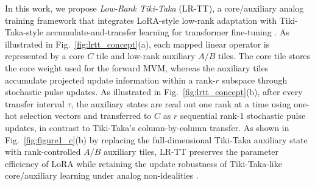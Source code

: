 \documentclass[AMA,LATO2COL]{WileyNJDv5}
\begin{document}
\noindent
In this work, we propose \emph{Low-Rank Tiki-Taka} (LR-TT), a core/auxiliary analog training framework that integrates LoRA-style low-rank adaptation with Tiki-Taka-style accumulate-and-transfer learning for transformer fine-tuning \cite{hu2021lora,gokmen2020tikitaka,gokmen2021ttv2}.
As illustrated in Fig.~\ref{fig:lrtt_concept}(a), each mapped linear operator is represented by a core \(C\) tile and low-rank auxiliary \(A/B\) tiles.
The core tile stores the core weight used for the forward MVM, whereas the auxiliary tiles accumulate projected update information within a rank-\(r\) subspace through stochastic pulse updates.
As illustrated in Fig.~\ref{fig:lrtt_concept}(b), after every transfer interval \(\tau\), the auxiliary states are read out one rank at a time using one-hot selection vectors and transferred to \(C\) as \(r\) sequential rank-1 stochastic pulse updates, in contrast to Tiki-Taka's column-by-column transfer.
As shown in Fig.~\ref{fig:figure1_c}(b) by replacing the full-dimensional Tiki-Taka auxiliary state with rank-controlled \(A/B\) auxiliary tiles, LR-TT preserves the parameter efficiency of LoRA while retaining the update robustness of Tiki-Taka-like core/auxiliary learning under analog non-idealities \cite{gokmen2020tikitaka,gokmen2021ttv2,noh2024retention_zeroshifting,rasch2024fastrobust}.
\end{document}

